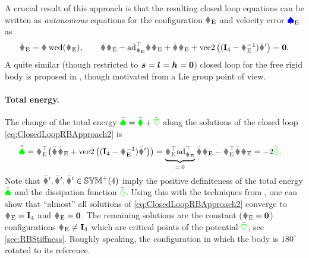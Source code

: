 A crucial result of this approach is that the resulting closed loop equations can be written as \textit{autonomous} equations for the configuration $\bodyHomoCoordE{}{}$ and velocity error $\boldsymbol{\textcolor{blue}{\spadesuit}}_{\mathrm{E}}{}{}$ as
\begin{align}\label{eq:ClosedLoopRBApproach2}
 \bodyHomoCoordEd{}{} = \bodyHomoCoord{}{} \wedOp(\bodyVelE{}{}),
\qquad
 \bodyInertiaMatC{}{} \bodyVelEd{}{} - \ad{\bodyVelE{}{}}^\top \bodyInertiaMatC{}{} \bodyVelE{}{} + \bodyDissMatC{}{} \bodyVelE{}{} + \veeTwoOp \big( (\idMat[4] - \bodyHomoCoordE{}{}^{-1}) \bodyStiffMatCp{}{} \big) = \tuple{0}.
\end{align}
A quite similar (though restricted to $\bodyCOM{}{}=\bodyCOD{}{}=\bodyCOS{}{}=\tuple{0}$) closed loop for the free rigid body is proposed in \cite{Koditschek:TotalEnergy}, though motivated from a Lie group point of view.

\paragraph{Total energy.}
The change of the total energy $\bar{\textcolor{green}{\spadesuit}} = \bar{\textcolor{green}{\blacklozenge}} + \bar{\textcolor{green}{\heartsuit}}$ along the solutions of the closed loop \eqref{eq:ClosedLoopRBApproach2} is 
\begin{align}\label{eq:CtrlTotalEnergyRBAppraoch2}
 \totalEnergyCd 
 &= \bodyVelE{}{}^\top \big( \bodyInertiaMatC{}{} \bodyVelEd{}{} + \veeTwoOp\big( (\idMat[4] - \bodyHomoCoordE{}{}^{-1}) \bodyStiffMatCp{}{} \big) \big)
 = \underbrace{\bodyVelE{}{}^\top \ad{\bodyVelE{}{}}^\top}_{=\,0} \bodyInertiaMatC{}{} \bodyVelE{}{} - \bodyVelE{}{}^\top \bodyDissMatC{}{} \bodyVelE{}{}
 = -2\dissFktC.
\end{align}
Note that $\bodyStiffMatCp{}{}, \bodyDissMatCp{}{}, \bodyInertiaMatCp{}{} \in \SymMatP(4)$ imply the positive definiteness of the total energy $\bar{\textcolor{green}{\spadesuit}}$ and the dissipation function $\bar{\textcolor{green}{\Diamond}}$.
Using this with the techniques from \cite{Koditschek:TotalEnergy}, one can show that ``almost'' all solutions of \eqref{eq:ClosedLoopRBApproach2} converge to $\bodyHomoCoordE{}{} = \idMat[4]$ and $\bodyVelE{}{} = \tuple{0}$.
The remaining solutions are the constant ($\bodyVelE{}{} = \tuple{0}$) configurations $\bodyHomoCoordE{}{} \neq \idMat[4]$ which are critical points of the potential $\bar{\textcolor{green}{\heartsuit}}$, see \autoref{sec:RBStiffness}.
Roughly speaking, the configuration in which the body is $180^\circ$ rotated to its reference.


